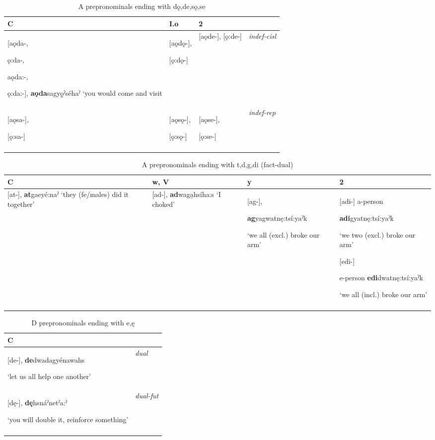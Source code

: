 \begin{table}
\caption{A prepronominals ending with dǫ,de,sǫ,se}
\label{tab:1:finalindefcislrepprefix}
\scriptsize{
\begin{tabularx}{\textwidth}{XXXX}
\lsptoprule
C & I.o & 2 & \\
\midrule
{}[aǫda-, 

{}ǫ:da-, 

{}aǫda:-, 

{}ǫ:da:-], \textbf{aǫda}sagyǫ̱ˀséhaˀ ‘you would come and visit & [aǫdǫ-],

{}[ǫ:dǫ-] & [aǫde-], [ǫ:de-] & {\itshape indef-cisl}\\
{}[aǫsa-], 

{}[ǫ:sa-] & [aǫsǫ-], 

{}[ǫ:sǫ-] & [aǫse-], 

{}[ǫ:se-] & {\itshape indef-rep}\\
\lspbottomrule
\end{tabularx}}
\end{table}

\lipsum[1-1]



\begin{table}
\caption{A prepronominals ending with t,d,g,di (fact-dual)}
\label{tab:1:2finalindefcislrep}
\scriptsize{
\begin{tabularx}{\textwidth}{XXXX}
\lsptoprule
C & w, V & y & 2 \\
\midrule
{} [at-], \textbf{at}gaeyé:naˀ ‘they (fe/males) did it together’ & [ad-], \textbf{ad}waga̱hsíha:s ‘I choked’ & [ag-],

\textbf{ag}yagwatnę:tsí:yaˀk 

‘we all (excl.) broke our arm’ & [adi-] a-person 

\textbf{adi}gyatnę:tsí:yaˀk 

‘we two (excl.) broke our arm’ 

{} [edi-] 

e-person \textbf{edi}dwatnę:tsí:yaˀk 

‘we all (incl.) broke our arm’ \\
\lspbottomrule
\end{tabularx}}
\end{table}




\begin{table}
\caption{D prepronominals ending with e,ę}
\label{tab:1:dualanddualfut}
\scriptsize{
\begin{tabularx}{\textwidth}{XX}
\lsptoprule
C & \\
\midrule
{}[de-], \textbf{de}dwadagyénawahs 

‘let us all help one another’ & {\itshape dual}\\
{}[dę-], \textbf{dę}hsnáˀnetˀa:ˀ 

‘you will double it, reinforce something’ & {\itshape dual-fut}\\
\lspbottomrule
\end{tabularx}}
\end{table}


